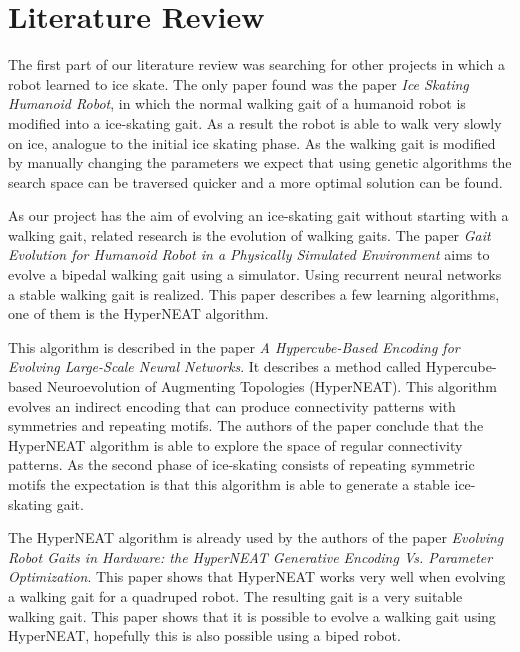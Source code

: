 \documentclass[10pt]{article}
\begin{document}
\section{Literature Review}
The first part of our literature review was searching for other projects in which a robot learned to ice skate. The only paper found was the paper \emph{Ice Skating Humanoid Robot}\cite{springerlink:10.1007/978-3-642-32527-4_19}, in which the normal walking gait of a humanoid robot is modified into a ice-skating gait. As a result the robot is able to walk very slowly on ice, analogue to the initial ice skating phase. As the walking gait is modified by manually changing the parameters we expect that using genetic algorithms the search space can be traversed quicker and a more optimal solution can be found.

As our project has the aim of evolving an ice-skating gait without starting with a walking gait, related research is the evolution of walking gaits. The paper \emph{Gait Evolution for Humanoid Robot in a Physically Simulated Environment}\cite{springerlink:10.1007/978-3-642-22907-7_9} aims to evolve a bipedal walking gait using a simulator. Using recurrent neural networks a stable walking gait is realized. This paper describes a few learning algorithms, one of them is the HyperNEAT algorithm.

This algorithm is described in the paper \emph{A Hypercube-Based Encoding for Evolving Large-Scale Neural Networks}\cite{mitpress:hypercubebasedencoding}. It describes a method called Hypercube-based Neuroevolution of Augmenting Topologies (HyperNEAT). This algorithm evolves an indirect encoding that can produce connectivity patterns with symmetries and repeating motifs. The authors of the paper conclude that the HyperNEAT algorithm is able to explore the space of regular connectivity patterns. As the second phase of ice-skating consists of repeating symmetric motifs the expectation is that this algorithm is able to generate a stable ice-skating gait.

The HyperNEAT algorithm is already used by the authors of the paper \emph{Evolving Robot Gaits in Hardware: the HyperNEAT Generative Encoding Vs. Parameter Optimization}\cite{Yosinski2011EvolvedGaits}. This paper shows that HyperNEAT works very well when evolving a walking gait for a quadruped robot. The resulting gait is a very suitable walking gait. This paper shows that it is possible to evolve a walking gait using HyperNEAT, hopefully this is also possible using a biped robot.
\end{document}
